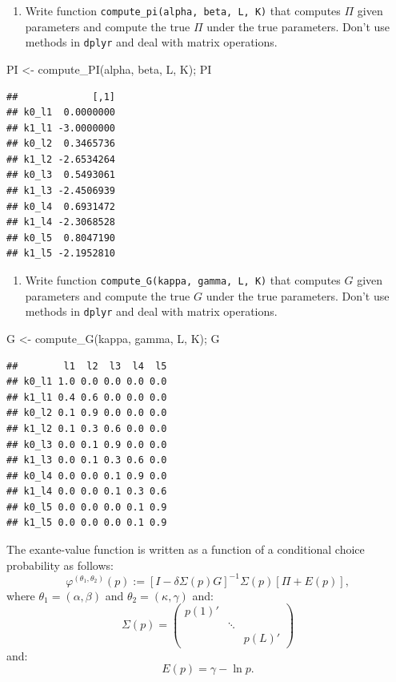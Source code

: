 \documentclass[
]{book}
\newenvironment{Shaded}{\begin{snugshade}}{\end{snugshade}}
\newcommand{\FunctionTok}[1]{\textcolor[rgb]{0.00,0.00,0.00}{#1}}
\newcommand{\NormalTok}[1]{#1}
\newcommand{\OtherTok}[1]{\textcolor[rgb]{0.56,0.35,0.01}{#1}}
\providecommand{\tightlist}{%
  \setlength{\itemsep}{0pt}\setlength{\parskip}{0pt}}
\begin{document}
\begin{enumerate}
\def\labelenumi{\arabic{enumi}.}
\setcounter{enumi}{1}
\tightlist
\item
  Write function \texttt{compute\_pi(alpha,\ beta,\ L,\ K)} that computes \(\Pi\) given parameters and compute the true \(\Pi\) under the true parameters. Don't use methods in \texttt{dplyr} and deal with matrix operations.
\end{enumerate}

\begin{Shaded}
\begin{Highlighting}[]
\NormalTok{PI }\OtherTok{\textless{}{-}} \FunctionTok{compute\_PI}\NormalTok{(alpha, beta, L, K); PI}
\end{Highlighting}
\end{Shaded}

\begin{verbatim}
##             [,1]
## k0_l1  0.0000000
## k1_l1 -3.0000000
## k0_l2  0.3465736
## k1_l2 -2.6534264
## k0_l3  0.5493061
## k1_l3 -2.4506939
## k0_l4  0.6931472
## k1_l4 -2.3068528
## k0_l5  0.8047190
## k1_l5 -2.1952810
\end{verbatim}

\begin{enumerate}
\def\labelenumi{\arabic{enumi}.}
\setcounter{enumi}{2}
\tightlist
\item
  Write function \texttt{compute\_G(kappa,\ gamma,\ L,\ K)} that computes \(G\) given parameters and compute the true \(G\) under the true parameters. Don't use methods in \texttt{dplyr} and deal with matrix operations.
\end{enumerate}

\begin{Shaded}
\begin{Highlighting}[]
\NormalTok{G }\OtherTok{\textless{}{-}} \FunctionTok{compute\_G}\NormalTok{(kappa, gamma, L, K); G}
\end{Highlighting}
\end{Shaded}

\begin{verbatim}
##        l1  l2  l3  l4  l5
## k0_l1 1.0 0.0 0.0 0.0 0.0
## k1_l1 0.4 0.6 0.0 0.0 0.0
## k0_l2 0.1 0.9 0.0 0.0 0.0
## k1_l2 0.1 0.3 0.6 0.0 0.0
## k0_l3 0.0 0.1 0.9 0.0 0.0
## k1_l3 0.0 0.1 0.3 0.6 0.0
## k0_l4 0.0 0.0 0.1 0.9 0.0
## k1_l4 0.0 0.0 0.1 0.3 0.6
## k0_l5 0.0 0.0 0.0 0.1 0.9
## k1_l5 0.0 0.0 0.0 0.1 0.9
\end{verbatim}

The exante-value function is written as a function of a conditional choice probability as follows:
\[
\varphi^{(\theta_1, \theta_2)}(p) := [I - \delta \Sigma(p) G]^{-1}\Sigma(p)[\Pi + E(p)],
\]
where \(\theta_1 = (\alpha, \beta)\) and \(\theta_2 = (\kappa, \gamma)\) and:
\[
\Sigma(p) =
\begin{pmatrix}
p(1)' & & \\
 & \ddots & \\
 & & p(L)'
\end{pmatrix}
\]
and:
\[
E(p) = 
\gamma - \ln p.
\]
\end{document}
